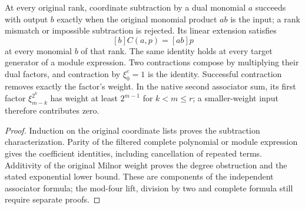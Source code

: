 \begin{lemma}
  \label{lem:lin-secondary-contraction}
  \leanok
  At every original rank, coordinate subtraction by a dual monomial $a$
  succeeds with output $b$ exactly when the original monomial product
  $ab$ is the input; a rank mismatch or impossible subtraction is rejected.
  Its linear extension satisfies
  \[
    [b]C(a,p)=[ab]p
  \]
  at every monomial $b$ of that rank. The same identity holds at every
  target generator of a module expression. Two contractions compose by
  multiplying their dual factors, and contraction by $\xi_0^e=1$ is the
  identity. Successful contraction removes exactly the factor's weight.
  In the native second associator sum, its first factor
  $\xi_{m-k}^{2^k}$ has weight at least $2^{m-1}$ for $k<m\le r$;
  a smaller-weight input therefore contributes zero.
\end{lemma}
\begin{proof}
  \leanok
  Induction on the original coordinate lists proves the subtraction
  characterization. Parity of the filtered complete polynomial or module
  expression gives the coefficient identities, including cancellation of
  repeated terms. Additivity of the original Milnor weight proves the
  degree obstruction and the stated exponential lower bound. These are
  components of the independent associator formula; the mod-four lift,
  division by two and complete formula still require separate proofs.
\end{proof}

